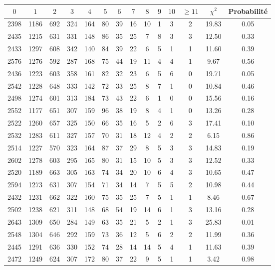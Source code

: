 \documentclass[12pt,a4paper]{article}
\begin{document}
\begin{center}
\begin{tabular}{|c|c|c|c|c|c|c|c|c|c|c|c|c|c|}
\hline
$0$ & $1$ & $2$ & $3$ & $4$ & $5$ & $6$ & $7$ & $8$ & $9$ & $10$ & $\geq 11$ & $\chi^2$ & Probabilité \\ \hline
2398 & 1186 & 692 & 324 & 164 & 80 & 39 & 16 & 10 & 1 & 3 & 2 & 19.83 &  0.05\\ \hline
2435 & 1215 & 631 & 331 & 148 & 86 & 35 & 25 & 7 & 8 & 3 & 3 & 12.50 &  0.33\\ \hline
2433 & 1297 & 608 & 342 & 140 & 84 & 39 & 22 & 6 & 5 & 1 & 1 & 11.60 &  0.39\\ \hline
2576 & 1276 & 592 & 287 & 168 & 75 & 44 & 19 & 11 & 4 & 4 & 1 &  9.67 &  0.56\\ \hline
2436 & 1223 & 603 & 358 & 161 & 82 & 32 & 23 & 6 & 5 & 6 & 0 & 19.71 &  0.05\\ \hline
2542 & 1228 & 648 & 333 & 142 & 72 & 33 & 25 & 8 & 7 & 1 & 0 & 10.84 &  0.46\\ \hline
2498 & 1274 & 601 & 313 & 184 & 73 & 43 & 22 & 6 & 1 & 0 & 0 & 15.56 &  0.16\\ \hline
2552 & 1177 & 651 & 307 & 159 & 96 & 38 & 19 & 8 & 4 & 1 & 0 & 13.26 &  0.28\\ \hline
2522 & 1260 & 657 & 325 & 150 & 66 & 35 & 16 & 5 & 2 & 6 & 3 & 17.41 &  0.10\\ \hline
2532 & 1283 & 611 & 327 & 157 & 70 & 31 & 18 & 12 & 4 & 2 & 2 &  6.15 &  0.86\\ \hline
2514 & 1227 & 570 & 323 & 164 & 87 & 37 & 29 & 8 & 5 & 3 & 3 & 14.83 &  0.19\\ \hline
2602 & 1278 & 603 & 295 & 165 & 80 & 31 & 15 & 10 & 5 & 3 & 3 & 12.52 &  0.33\\ \hline
2520 & 1189 & 663 & 305 & 163 & 74 & 34 & 20 & 10 & 6 & 4 & 3 & 10.65 &  0.47\\ \hline
2594 & 1273 & 631 & 307 & 154 & 71 & 34 & 14 & 7 & 5 & 5 & 2 & 10.98 &  0.44\\ \hline
2432 & 1231 & 662 & 322 & 160 & 75 & 35 & 25 & 7 & 5 & 1 & 1 &  8.46 &  0.67\\ \hline
2502 & 1238 & 621 & 311 & 148 & 68 & 54 & 19 & 14 & 6 & 1 & 3 & 13.16 &  0.28\\ \hline
2643 & 1309 & 650 & 284 & 149 & 63 & 35 & 21 & 5 & 2 & 1 & 3 & 25.83 &  0.01\\ \hline
2548 & 1304 & 646 & 292 & 159 & 73 & 36 & 12 & 5 & 6 & 2 & 2 & 11.99 &  0.36\\ \hline
2445 & 1291 & 636 & 330 & 152 & 74 & 28 & 14 & 14 & 5 & 4 & 1 & 11.63 &  0.39\\ \hline
2472 & 1249 & 624 & 307 & 172 & 80 & 37 & 22 & 9 & 5 & 1 & 1 &  3.42 &  0.98\\ \hline
\end{tabular}
\end{center}
\end{document}
